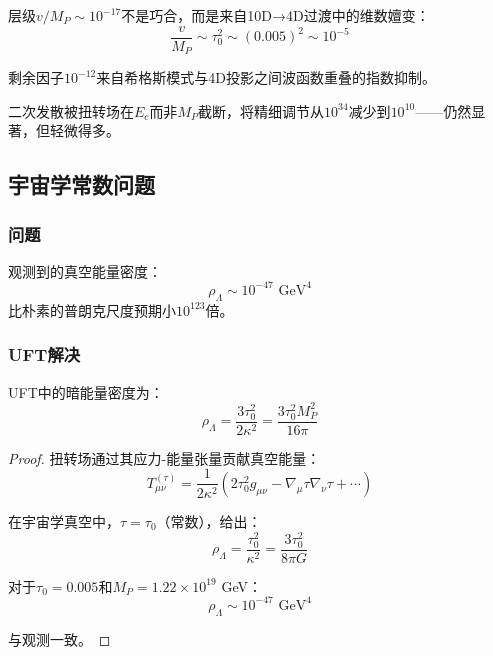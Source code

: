 \begin{insight}[来自维数嬗变的层级]
层级$v/M_P \sim 10^{-17}$不是巧合，而是来自10D→4D过渡中的维数嬗变：
\begin{equation}
    \frac{v}{M_P} \sim \tau_0^2 \sim (0.005)^2 \sim 10^{-5}
\end{equation}

剩余因子$10^{-12}$来自希格斯模式与4D投影之间波函数重叠的指数抑制。
\end{insight}

二次发散被扭转场在$E_c$而非$M_P$截断，将精细调节从$10^{34}$减少到$10^{10}$——仍然显著，但轻微得多。

\subsection{宇宙学常数问题}

\subsubsection{问题}

观测到的真空能量密度：
\begin{equation}
    \rho_\Lambda \sim 10^{-47} \text{ GeV}^4
\end{equation}
比朴素的普朗克尺度预期小$10^{123}$倍。

\subsubsection{UFT解决}

\begin{theorem}[来自扭转场的宇宙学常数]
UFT中的暗能量密度为：
\begin{equation}
    \rho_\Lambda = \frac{3\tau_0^2}{2\kappa^2} = \frac{3\tau_0^2 M_P^2}{16\pi}
\end{equation}
\end{theorem}

\begin{proof}
扭转场通过其应力-能量张量贡献真空能量：
\begin{equation}
    T_{\mu\nu}^{(\tau)} = \frac{1}{2\kappa^2} \left( 2\tau_0^2 g_{\mu\nu} - \nabla_\mu \tau \nabla_\nu \tau + \cdots \right)
\end{equation}

在宇宙学真空中，$\tau = \tau_0$（常数），给出：
\begin{equation}
    \rho_\Lambda = \frac{\tau_0^2}{\kappa^2} = \frac{3\tau_0^2}{8\pi G}
\end{equation}

对于$\tau_0 = 0.005$和$M_P = 1.22 \times 10^{19}$ GeV：
\begin{equation}
    \rho_\Lambda \sim 10^{-47} \text{ GeV}^4
\end{equation}

与观测一致。
\end{proof}

